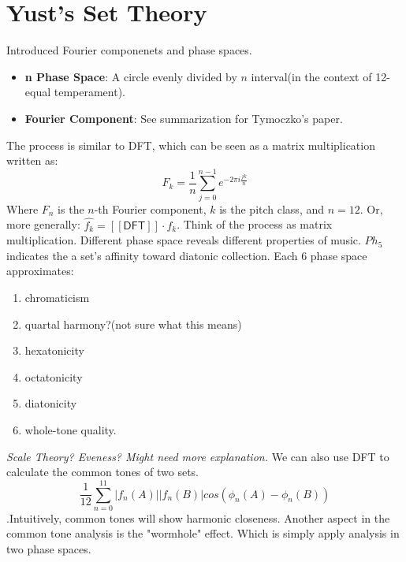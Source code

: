 \documentclass[12pt]{report}
\theoremstyle{definition}
\begin{document}
\section{Yust's Set Theory}
Introduced Fourier componenets and phase spaces. 
\begin{itemize}
    \item \textbf{n Phase Space}: A circle evenly divided by $n$ interval(in the context of 12-equal temperament).
    \item \textbf{Fourier Component}: See summarization for Tymoczko's paper.
\end{itemize}
The process is similar to DFT, which can be seen as a matrix multiplication written as:
\[F_k=\frac{1}{n}\sum_{j=0}^{n-1}e^{-2\pi i\frac{jk}{n}}\]
Where $F_n$ is the $n$-th Fourier component, $k$ is the pitch class, and $n=12$. Or, more generally:
$\hat{f_k}=[[\mathsf{DFT}]]\cdot f_k$. Think of the process as matrix multiplication.
Different phase space reveals different properties of music. $Ph_5$ indicates 
the a set's affinity toward diatonic collection. Each $6$ phase space approximates:
\begin{enumerate}
    \item chromaticism
    \item quartal harmony?(not sure what this means)
    \item hexatonicity
    \item octatonicity
    \item diatonicity
    \item whole-tone quality.
\end{enumerate}
\emph{Scale Theory? Eveness? Might need more explanation.}
We can also use DFT to calculate the common tones of two sets. 
\[\frac{1}{12}\sum_{n=0}^{11}|f_n(A)||f_n(B)|cos(\phi_n(A)-\phi_n(B))\].Intuitively,
common tones will show harmonic closeness. Another aspect in the common tone analysis
is the "wormhole" effect. Which is simply apply analysis in two phase spaces.
\end{document}
